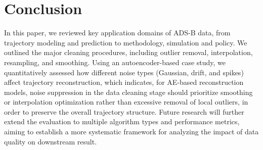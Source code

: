 \section{Conclusion}\label{conclusion}


In this paper, we reviewed key application domains of ADS-B data, from trajectory modeling and prediction to methodology, simulation and policy. We outlined the major cleaning procedures, including outlier removal, interpolation, resampling, and smoothing. Using an autoencoder-based case study, we quantitatively assessed how different noise types (Gaussian, drift, and spikes) affect trajectory reconstruction, which indicates, for AE-based reconstruction models, noise suppression in the data cleaning stage should prioritize smoothing or interpolation optimization rather than excessive removal of local outliers, in order to preserve the overall trajectory structure. Future research will further extend the evaluation to multiple algorithm types and performance metrics, aiming to establish a more systematic framework for analyzing the impact of data quality on downstream result.